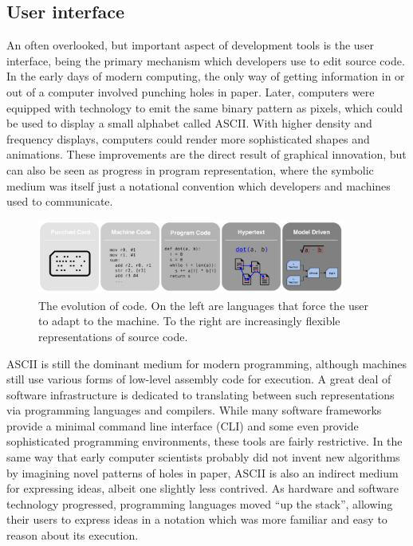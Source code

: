 \documentclass[12pt,initial,twoside,maitrise]{dms}
\numberwithin{equation}{section}
\numberwithin{table}{chapter}
\numberwithin{figure}{chapter}
\begin{document}
\subsection{User interface}

An often overlooked, but important aspect of development tools is the user interface, being the primary mechanism which developers use to edit source code. In the early days of modern computing, the only way of getting information in or out of a computer involved punching holes in paper. Later, computers were equipped with technology to emit the same binary pattern as pixels, which could be used to display a small alphabet called ASCII. With higher density and frequency displays, computers could render more sophisticated shapes and animations. These improvements are the direct result of graphical innovation, but can also be seen as progress in program representation, where the symbolic medium was itself just a notational convention which developers and machines used to communicate.

\begin{figure}
    \centering
    \includegraphics[width=0.90\textwidth]{../figures/progress_in_program.png}
    \caption{The evolution of code. On the left are languages that force the user to adapt to the machine. To the right are increasingly flexible representations of source code.}
    \label{fig:evolution_of_programming}
\end{figure}

ASCII is still the dominant medium for modern programming, although machines still use various forms of low-level assembly code for execution. A great deal of software infrastructure is dedicated to translating between such representations via programming languages and compilers. While many software frameworks provide a minimal command line interface (CLI) and some even provide sophisticated programming environments, these tools are fairly restrictive. In the same way that early computer scientists probably did not invent new algorithms by imagining novel patterns of holes in paper, ASCII is also an indirect medium for expressing ideas, albeit one slightly less contrived. As hardware and software technology progressed, programming languages moved ``up the stack'', allowing their users to express ideas in a notation which was more familiar and easy to reason about its execution.
\end{document}
